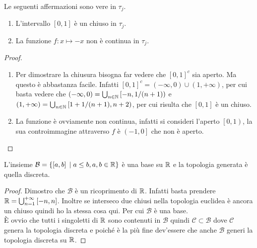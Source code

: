 \begin{theorem}
	Le seguenti affermazioni sono vere in $\tau_j$.
	\begin{enumerate}
		\item L'intervallo $\left[0,1\right]$ è un chiuso in $\tau_j$. 
		\item La funzione $f \colon x \mapsto -x$ non è continua in $\tau_j$.
	\end{enumerate}
\end{theorem}
\begin{proof}
	\begin{enumerate}
		\item Per dimostrare la chiusura bisogna far vedere che $\left[0,1\right]^c$ sia aperto. Ma questo è abbastanza facile. Infatti $\left[0,1\right]^c = \left(-\infty, 0\right) \cup \left(1, +\infty\right)$, per cui basta vedere che $\left(-\infty, 0\right) = \bigcup_{n \in \mathbb{N}} \left[-n, 1/(n+1)\right)$ e $\left(1, +\infty\right) = \bigcup_{n \in \mathbb{N}} \left[1+1/(n+1), n+2\right)$, per cui risulta che $\left[0,1\right]$ è un chiuso.
		\item La funzione è ovviamente non continua, infatti si consideri l'aperto $\left[0,1\right)$, la sua controimmagine attraverso $f$ è $\left(-1, 0\right]$ che non è aperto.
	\end{enumerate}
\end{proof}

\begin{theorem}
	L'insieme $\mathcal{B} = \{ \left[a, b\right] \; | \; a \le b, a, b \in \mathbb{R} \}$ è una base su $\mathbb{R}$ e la topologia generata è quella discreta. 
\end{theorem}
\begin{proof}
	Dimostro che $\mathcal{B}$ è un ricoprimento di $\mathbb{R}$. Infatti basta prendere $\mathbb{R} = \bigcup^{+\infty}_{n=1} \left[-n, n\right]$. Inoltre se interseco due chiusi nella topologia euclidea è ancora un chiuso quindi ho la stessa cosa qui. Per cui $\mathcal{B}$ è una base. \\ 
	
	È ovvio che tutti i singoletti di $\mathbb{R}$ sono contenuti in $\mathcal{B}$ quindi $\mathcal{C}\subset \mathcal{B}$ dove $\mathcal{C}$ genera la topologia discreta e poiché è la più fine dev'essere che anche $\mathcal{B}$ generi la topologia discreta su $\mathbb{R}$.
\end{proof}

